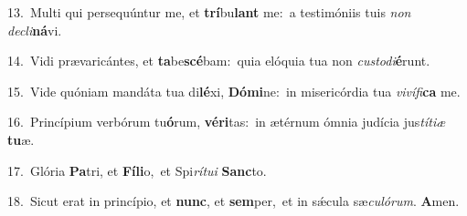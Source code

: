 {\numbfont\textcolor{\numbcolor}{13.}}~Multi qui persequúntur me, et \textbf{trí}\-bu\textbf{lant} me:~\star a testimóniis tuis \textit{non} \textit{de}\-\textit{cli}\textbf{ná}vi.\par
{\numbfont\textcolor{\numbcolor}{14.}}~Vidi prævaricántes, et \textbf{ta}\-be\-\textbf{scé}\-bam:~\star quia elóquia tua non \textit{cus}\-\textit{to}\textit{di}\textbf{é}runt.\par
{\numbfont\textcolor{\numbcolor}{15.}}~Vide quóniam mandáta tua di\-\textbf{lé}\-xi, \textbf{Dó}\-\textbf{mi}ne:~\star in misericórdia tua \textit{vi}\-\textit{ví}\textit{fi}\textbf{ca} me.\par
{\numbfont\textcolor{\numbcolor}{16.}}~Princípium verbórum tu\-\textbf{ó}\-rum, \textbf{vé}\-\textbf{ri}tas:~\star in ætérnum ómnia judícia jus\-\textit{tí}\-\textit{ti}\textit{æ} \textbf{tu}\-æ.\par
{\numbfont\textcolor{\numbcolor}{17.}}~Glória \textbf{Pa}\-tri, et \textbf{Fí}\-\textbf{li}o,~\star et Spi\-\textit{rí}\-\textit{tu}\textit{i} \textbf{Sanc}\-to.\par
{\numbfont\textcolor{\numbcolor}{18.}}~Sicut erat in princípio, et \textbf{nunc}\-, et \textbf{sem}\-per,~\star et in sǽcula sæ\-\textit{cu}\-\textit{ló}\textit{rum}. \textbf{A}\-men.\par
